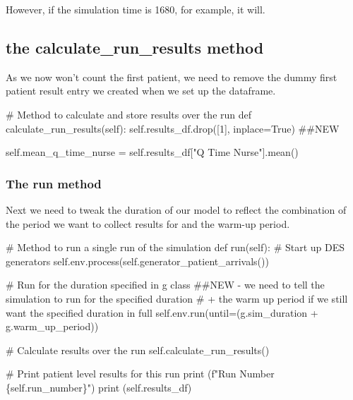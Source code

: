 \documentclass[
  letterpaper,
  DIV=11,
  numbers=noendperiod]{scrreprt}
\newenvironment{Shaded}{\begin{snugshade}}{\end{snugshade}}
\newcommand{\BuiltInTok}[1]{\textcolor[rgb]{0.00,0.23,0.31}{#1}}
\newcommand{\CommentTok}[1]{\textcolor[rgb]{0.37,0.37,0.37}{#1}}
\newcommand{\DecValTok}[1]{\textcolor[rgb]{0.68,0.00,0.00}{#1}}
\newcommand{\KeywordTok}[1]{\textcolor[rgb]{0.00,0.23,0.31}{#1}}
\newcommand{\NormalTok}[1]{\textcolor[rgb]{0.00,0.23,0.31}{#1}}
\newcommand{\OperatorTok}[1]{\textcolor[rgb]{0.37,0.37,0.37}{#1}}
\newcommand{\SpecialCharTok}[1]{\textcolor[rgb]{0.37,0.37,0.37}{#1}}
\newcommand{\SpecialStringTok}[1]{\textcolor[rgb]{0.13,0.47,0.30}{#1}}
\newcommand{\StringTok}[1]{\textcolor[rgb]{0.13,0.47,0.30}{#1}}
\newcommand{\VariableTok}[1]{\textcolor[rgb]{0.07,0.07,0.07}{#1}}
\begin{document}
However, if the simulation time is 1680, for example, it will.

\subsection{the calculate\_run\_results
method}\label{the-calculate_run_results-method-1}

As we now won't count the first patient, we need to remove the dummy
first patient result entry we created when we set up the dataframe.

\label{dummy_remove}
\begin{Shaded}
\begin{Highlighting}[]
\CommentTok{\# Method to calculate and store results over the run}
\KeywordTok{def}\NormalTok{ calculate\_run\_results(}\VariableTok{self}\NormalTok{):}
    \VariableTok{self}\NormalTok{.results\_df.drop([}\DecValTok{1}\NormalTok{], inplace}\OperatorTok{=}\VariableTok{True}\NormalTok{) }\CommentTok{\#\#NEW}

    \VariableTok{self}\NormalTok{.mean\_q\_time\_nurse }\OperatorTok{=} \VariableTok{self}\NormalTok{.results\_df[}\StringTok{"Q Time Nurse"}\NormalTok{].mean()}
\end{Highlighting}
\end{Shaded}

\subsubsection{The run method}\label{the-run-method-1}

Next we need to tweak the duration of our model to reflect the
combination of the period we want to collect results for and the warm-up
period.

\label{single_run}
\begin{Shaded}
\begin{Highlighting}[]
\CommentTok{\# Method to run a single run of the simulation}
\KeywordTok{def}\NormalTok{ run(}\VariableTok{self}\NormalTok{):}
    \CommentTok{\# Start up DES generators}
    \VariableTok{self}\NormalTok{.env.process(}\VariableTok{self}\NormalTok{.generator\_patient\_arrivals())}

    \CommentTok{\# Run for the duration specified in g class}
    \CommentTok{\#\#NEW {-} we need to tell the simulation to run for the specified duration}
    \CommentTok{\# + the warm up period if we still want the specified duration in full}
    \VariableTok{self}\NormalTok{.env.run(until}\OperatorTok{=}\NormalTok{(g.sim\_duration }\OperatorTok{+}\NormalTok{ g.warm\_up\_period))}

    \CommentTok{\# Calculate results over the run}
    \VariableTok{self}\NormalTok{.calculate\_run\_results()}

    \CommentTok{\# Print patient level results for this run}
    \BuiltInTok{print}\NormalTok{ (}\SpecialStringTok{f"Run Number }\SpecialCharTok{\{}\VariableTok{self}\SpecialCharTok{.}\NormalTok{run\_number}\SpecialCharTok{\}}\SpecialStringTok{"}\NormalTok{)}
    \BuiltInTok{print}\NormalTok{ (}\VariableTok{self}\NormalTok{.results\_df)}
\end{Highlighting}
\end{Shaded}
\end{document}
